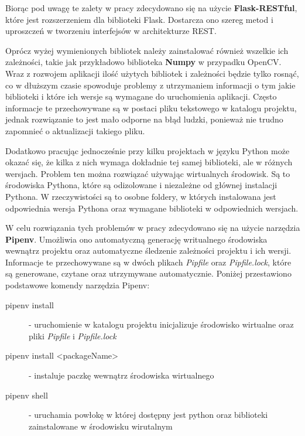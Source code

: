 Biorąc pod uwagę te zalety w pracy zdecydowano
się na użycie \textbf{Flask-RESTful}, które jest rozszerzeniem dla biblioteki Flask. Dostarcza
ono szereg metod i uproszczeń w tworzeniu interfejsów w architekturze REST.\newline

Oprócz wyżej wymienionych bibliotek należy zainstalowa\'c również wszelkie ich zależności, takie jak
przykładowo biblioteka \textbf{Numpy} w przypadku OpenCV. Wraz z rozwojem aplikacji iloś\'c użytych
bibliotek i zależności będzie tylko rosną\'c, co w dłuższym czasie spowoduje problemy z utrzymaniem
informacji o tym jakie biblioteki i które ich wersje są wymagane do uruchomienia aplikacji. Często
informacje te przechowywane są w postaci pliku tekstowego w katalogu projektu, jednak rozwiązanie to
jest mało odporne na błąd ludzki, ponieważ nie trudno zapomnie\'c o aktualizacji takiego pliku.

Dodatkowo pracując jednocześnie przy kilku projektach w języku Python może okaza\'c się, że kilka z
nich wymaga dokładnie tej samej biblioteki, ale w różnych wersjach. Problem ten można rozwiąza\'c
używając wirtualnych środowisk. Są to środowiska Pythona, które są odizolowane i niezależne od głównej
instalacji Pythona. W rzeczywistości są to osobne foldery, w których instalowana jest odpowiednia wersja
Pythona oraz wymagane biblioteki w odpowiednich wersjach.

W celu rozwiązania tych problemów w pracy zdecydowano się na użycie narzędzia \textbf{Pipenv}.
Umożliwia ono automatyczną generację writualnego środowiska wewnątrz projektu oraz automatyczne
śledzenie zależności projektu i ich wersji. Informacje te przechowywane są w dwóch plikach
\textit{Pipfile} oraz \textit{Pipfile.lock}, które są generowane, czytane oraz utrzymywane automatycznie.
Poniżej przestawiono podstawowe komendy narzędzia Pipenv:

\begin{description}
  \item[pipenv install] - uruchomienie w katalogu projektu inicjalizuje środowisko wirtualne oraz pliki
  \textit{Pipfile} i \textit{Pipfile.lock}

  \item[pipenv install <packageName>] - instaluje paczkę wewnątrz środowiska wirtualnego

  \item[pipenv shell] - uruchamia powłokę w której dostępny jest python oraz biblioteki zainstalowane
  w środowisku wirutalnym
\end{description}

